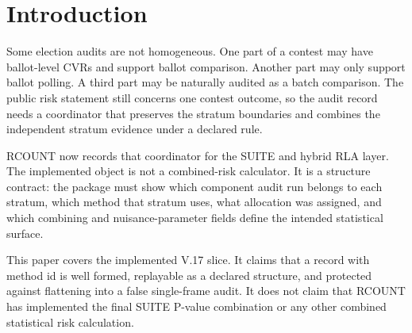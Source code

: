 \section{Introduction}

Some election audits are not homogeneous. One part of a contest may have
ballot-level CVRs and support ballot comparison. Another part may only support
ballot polling. A third part may be naturally audited as a batch comparison.
The public risk statement still concerns one contest outcome, so the audit
record needs a coordinator that preserves the stratum boundaries and combines
the independent stratum evidence under a declared rule.

RCOUNT now records that coordinator for the SUITE and hybrid RLA layer. The
implemented object is not a combined-risk calculator. It is a structure
contract: the package must show which component audit run belongs to each
stratum, which method that stratum uses, what allocation was assigned, and
which combining and nuisance-parameter fields define the intended statistical
surface.

This paper covers the implemented V.17 slice. It claims that a record with
method id  is well formed, replayable as a
declared structure, and protected against flattening into a false single-frame
audit. It does not claim that RCOUNT has implemented the final SUITE P-value
combination or any other combined statistical risk calculation.
